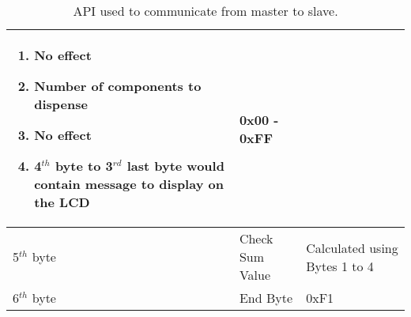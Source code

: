 \documentclass[a4paper,11pt]{article}
\numberwithin{figure}{section}
\numberwithin{table}{section}
\begin{document}
\begin{center}
\begin{table}[ht]
\begin{tabular}{| m{3cm} | m{5cm}| m{5cm} |}
\begin{enumerate}[nosep]
    																			\setlength{\parsep}{0pt} 
																				\item No effect
																				\item Number of components to dispense
																				\item No effect
																				\item 4$^{th}$ byte to 3$^{rd}$ last byte would contain message to display on the LCD
																			\end{enumerate} & 0x00 - 0xFF \\
			\hline
			5$^{th}$ byte & Check Sum Value & Calculated using Bytes 1 to 4 \\
			\hline
			6$^{th}$ byte & End Byte & 0xF1 \\
			\hline
			\end{tabular}
			\caption{API used to communicate from master to slave. \label{tab:M2SAPI}}
		\end{table}
	\end{center}
	\newpage
\end{document}
